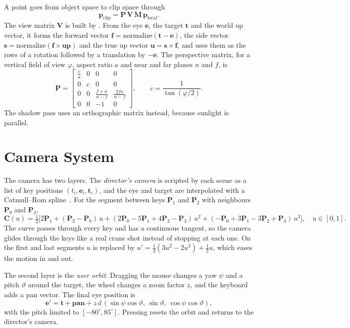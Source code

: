 \documentclass[11pt,a4paper]{report}
\newcommand{\code}[1]{\texttt{\detokenize{#1}}}
\newcommand{\key}[1]{\fbox{\footnotesize\ttfamily #1}}
\newcommand{\vect}[1]{\mathbf{#1}}
\newcommand{\mat}[1]{\mathbf{#1}}
\begin{document}
A point goes from object space to clip space through
\begin{equation}
\vect{p}_{\text{clip}} = \mat{P}\,\mat{V}\,\mat{M}\,\vect{p}_{\text{local}} .
\end{equation}
The view matrix $\mat{V}$ is built by \code{lookAt}. From the eye $\vect{e}$, the
target $\vect{t}$ and the world up vector, it forms the forward vector
$\vect{f}=\text{normalize}(\vect{t}-\vect{e})$, the side vector
$\vect{s}=\text{normalize}(\vect{f}\times\vect{up})$ and the true up vector
$\vect{u}=\vect{s}\times\vect{f}$, and uses them as the rows of a rotation followed by a
translation by $-\vect{e}$. The perspective matrix, for a vertical field of view
$\varphi$, aspect ratio $a$ and near and far planes $n$ and $f$, is
\begin{equation}
\mat{P}=\begin{bmatrix}
\frac{c}{a}&0&0&0\\[2pt] 0&c&0&0\\[2pt] 0&0&\frac{f+n}{n-f}&\frac{2fn}{n-f}\\[2pt] 0&0&-1&0
\end{bmatrix},\qquad c = \frac{1}{\tan(\varphi/2)} .
\end{equation}
The shadow pass uses an orthographic matrix instead, because sunlight is parallel.

\section{Camera System}

The camera has two layers. The \emph{director's camera} is scripted by each scene as a
list of key positions $(t_i, \vect{e}_i, \vect{t}_i)$, and the eye and target are
interpolated with a Catmull--Rom spline~\cite{catmull}. For the segment between keys
$\vect{P}_1$ and $\vect{P}_2$ with neighbours $\vect{P}_0$ and $\vect{P}_3$,
\begin{equation}
\vect{C}(u) = \tfrac12\Big[2\vect{P}_1 + (\vect{P}_2-\vect{P}_0)\,u
 + (2\vect{P}_0-5\vect{P}_1+4\vect{P}_2-\vect{P}_3)\,u^2
 + (-\vect{P}_0+3\vect{P}_1-3\vect{P}_2+\vect{P}_3)\,u^3\Big],\quad u\in[0,1].
\end{equation}
The curve passes through every key and has a continuous tangent, so the camera glides
through the keys like a real crane shot instead of stopping at each one. On the first
and last segments $u$ is replaced by $u' = \tfrac12(3u^2-2u^3)+\tfrac12u$, which eases
the motion in and out.

The second layer is the \emph{user orbit}. Dragging the mouse changes a yaw $\psi$ and a
pitch $\vartheta$ around the target, the wheel changes a zoom factor $z$, and the
keyboard adds a pan vector. The final eye position is
\begin{equation}
\vect{e}' = \vect{t} + \vect{pan} + z\,d\,(\sin\psi\cos\vartheta,\ \sin\vartheta,\ \cos\psi\cos\vartheta),
\end{equation}
with the pitch limited to $[-80^\circ, 85^\circ]$. Pressing \key{C} resets the orbit
and returns to the director's camera.
\end{document}
